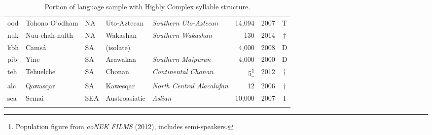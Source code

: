 \begin{table}
\begin{tabularx}{\textwidth}{lQlQQrlc}
 ood & {{Tohono O’odham}} &  NA & {Uto-Aztecan} & {\textit{Southern Uto-Aztecan}} &  14,094 & 2007 & T\\
 nuk & {{Nuu-chah-nulth}} &  NA & {Wakashan} & {\textit{Southern Wakashan}} &  130 & 2014 & †\\
 kbh & {{Camsá}} &  SA & {(isolate)} &  &  4,000 & 2008 & D\\
 pib & {{Yine}} &  SA & {Arawakan} & {\textit{Southern Maipuran}} &  4,000 & 2000 & D\\
 teh & {{Tehuelche}} &  SA & {Chonan} & {\textit{Continental Chonan}} &  5\footnote{Population figure from \textit{aoNEK FILMS} (2012), includes semi-speakers.\nocite{aoNEK2012}} & 2012 & †\\
 alc & {{Qawasqar}} &  SA & {Kawesqar} & {\textit{North Central Alacalufan}} &  12 & 2006 & †\\
 sea & {{Semai}} &  SEA  & {Austroasiatic} & {\textit{Aslian}} &  10,000 & 2007 & I\\
\lspbottomrule
\end{tabularx}
\caption{Portion of language sample with Highly Complex syllable structure.\label{tab:A.4}}
\end{table}
